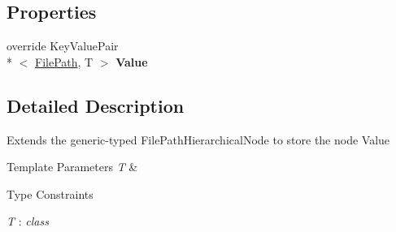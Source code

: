 \subsection*{Properties}
\begin{DoxyCompactItemize}
\item 
\hypertarget{class_cloud_api_public_1_1_model_1_1_file_path_hierarchical_node_with_value_3_01_t_01_4_aae6891ee0e14e6032919f708db8922f0}{override Key\-Value\-Pair\\*
$<$ \hyperlink{class_cloud_api_public_1_1_model_1_1_file_path}{File\-Path}, T $>$ {\bfseries Value}}\label{class_cloud_api_public_1_1_model_1_1_file_path_hierarchical_node_with_value_3_01_t_01_4_aae6891ee0e14e6032919f708db8922f0}

\end{DoxyCompactItemize}


\subsection{Detailed Description}
Extends the generic-\/typed File\-Path\-Hierarchical\-Node to store the node Value 


\begin{DoxyTemplParams}{Template Parameters}
{\em T} & \\
\hline
\end{DoxyTemplParams}
\begin{Desc}
\item[Type Constraints]\begin{description}
\item[{\em T} : {\em class}]\end{description}
\end{Desc}


